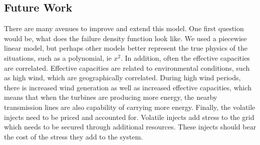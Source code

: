 \subsection{Future Work}
There are many avenues to improve and extend this model.  One first question would be, what does the failure density function look like.  We used a piecewise linear model, but perhaps other models better represent the true physics of the situations, such as a polynomial, ie $x^2$.  In addition, often the effective capacities are correlated.  Effective capacities are related to environmental conditions, such as high wind, which are geographically correlated.  During high wind periods, there is increased wind generation as well as increased effective capacities, which means that when the turbines are producing more energy, the nearby transmission lines are also capability of carrying more energy.  Finally, the volatile injects need to be priced and accounted for.  Volatile injects add stress to the grid which needs to be secured through additional resources.  These injects should bear the cost of the stress they add to the system.



